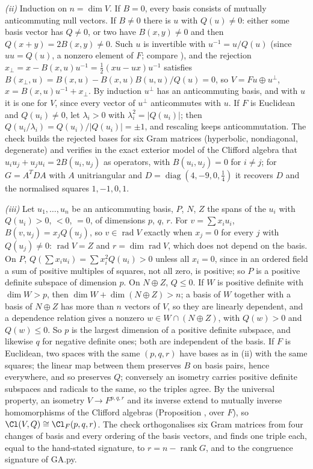 \emph{(ii)} Induction on $n = \dim V$. If $B = 0$, every basis consists of mutually anticommuting null vectors. If $B \ne 0$ there is $u$ with $Q(u) \ne 0$: either some basis vector has $Q \ne 0$, or two have $B(x, y) \ne 0$ and then $Q(x + y) = 2B(x, y) \ne 0$. Such $u$ is invertible with $u^{-1} = u/Q(u)$ (since $uu = Q(u)$, a nonzero element of $F$; compare ), and the rejection $x_{\perp} = x - B(x, u)u^{-1} = \tfrac12(xu - ux)u^{-1}$ satisfies $B(x_{\perp}, u) = B(x, u) - B(x, u)B(u, u)/Q(u) = 0$, so $V = Fu \oplus u^{\perp}$, $x = B(x,u)u^{-1} + x_{\perp}$. By induction $u^{\perp}$ has an anticommuting basis, and with $u$ it is one for $V$, since every vector of $u^{\perp}$ anticommutes with $u$. If $F$ is Euclidean and $Q(u_{i}) \ne 0$, let $\lambda_{i} > 0$ with $\lambda_{i}^{2} = |Q(u_{i})|$; then $Q(u_{i}/\lambda_{i}) = Q(u_{i})/|Q(u_{i})| = \pm 1$, and rescaling keeps anticommutation. The check builds the rejected bases for six Gram matrices (hyperbolic, nondiagonal, degenerate) and verifies in the exact exterior model of the Clifford algebra that $u_{i}u_{j} + u_{j}u_{i} = 2B(u_{i}, u_{j})$ as operators, with $B(u_{i}, u_{j}) = 0$ for $i \ne j$; for $G = A^{T}DA$ with $A$ unitriangular and $D = \operatorname{diag}(4, -9, 0, \tfrac14)$ it recovers $D$ and the normalised squares $1, -1, 0, 1$.

\emph{(iii)} Let $u_{1}, \dots, u_{n}$ be an anticommuting basis, $P$, $N$, $Z$ the spans of the $u_{i}$ with $Q(u_{i}) > 0$, $< 0$, $= 0$, of dimensions $p$, $q$, $r$. For $v = \sum x_{i}u_{i}$, $B(v, u_{j}) = x_{j}Q(u_{j})$, so $v \in \operatorname{rad} V$ exactly when $x_{j} = 0$ for every $j$ with $Q(u_{j}) \ne 0$: $\operatorname{rad} V = Z$ and $r = \dim \operatorname{rad} V$, which does not depend on the basis. On $P$, $Q(\sum x_{i}u_{i}) = \sum x_{i}^{2}Q(u_{i}) > 0$ unless all $x_{i} = 0$, since in an ordered field a sum of positive multiples of squares, not all zero, is positive; so $P$ is a positive definite subspace of dimension $p$. On $N \oplus Z$, $Q \le 0$. If $W$ is positive definite with $\dim W > p$, then $\dim W + \dim(N \oplus Z) > n$; a basis of $W$ together with a basis of $N \oplus Z$ has more than $n$ vectors of $V$, so they are linearly dependent, and a dependence relation gives a nonzero $w \in W \cap (N \oplus Z)$, with $Q(w) > 0$ and $Q(w) \le 0$. So $p$ is the largest dimension of a positive definite subspace, and likewise $q$ for negative definite ones; both are independent of the basis. If $F$ is Euclidean, two spaces with the same $(p, q, r)$ have bases as in (ii) with the same squares; the linear map between them preserves $B$ on basis pairs, hence everywhere, and so preserves $Q$; conversely an isometry carries positive definite subspaces and radicals to the same, so the triples agree. By the universal property, an isometry $V \to F^{p,q,r}$ and its inverse extend to mutually inverse homomorphisms of the Clifford algebras (Proposition , over $F$), so $\Cl(V, Q) \cong \Cl_{F}(p,q,r)$. The check orthogonalises six Gram matrices from four changes of basis and every ordering of the basis vectors, and finds one triple each, equal to the hand-stated signature, to $r = n - \operatorname{rank} G$, and to the congruence signature of GA.py.


